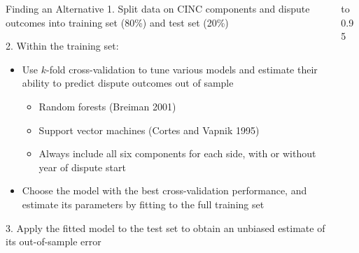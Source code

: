 \documentclass[final]{beamer}
\begin{document}
\begin{frame}{}
\begin{columns}
\begin{column}{.32\textwidth}
{\begin{block}{Finding an Alternative}
          \bigskip%
          \alert{1.} Split data on CINC components and dispute outcomes into
          training set (80\%) and test set (20\%)

          \bigskip%
          \alert{2.} Within the training set:
          \begin{itemize}
            \item Use $k$-fold cross-validation to tune various models and
            estimate their ability to predict dispute outcomes out of sample
            
            \begin{itemize}
              \item Random forests (Breiman 2001)
              \item Support vector machines (Cortes and Vapnik 1995)
              \item Always include all six components for each side, with or
              without year of dispute start
            \end{itemize}

            \medskip%
            \item Choose the model with the best cross-validation performance,
            and estimate its parameters by fitting to the full training set
          \end{itemize}

          \bigskip%
          \alert{3.} Apply the fitted model to the test set to obtain an
          unbiased estimate of its out-of-sample error
        \end{block}
      }
    \end{column}

    \begin{column}{.32\textwidth} 
      \vbox to 0.95
\end{column}
\end{columns}
\end{frame}
\end{document}
